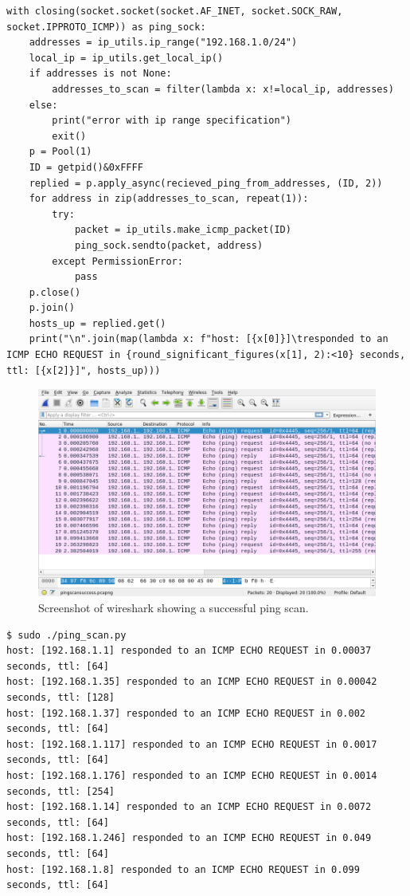 \documentclass[titlepage]{article}
\begin{document}
\begin{lstlisting}[label=pingscan,caption=An attempt at making a ping scanner.]
with closing(socket.socket(socket.AF_INET, socket.SOCK_RAW, socket.IPPROTO_ICMP)) as ping_sock:
    addresses = ip_utils.ip_range("192.168.1.0/24")
    local_ip = ip_utils.get_local_ip()
    if addresses is not None:
        addresses_to_scan = filter(lambda x: x!=local_ip, addresses)
    else:
        print("error with ip range specification")
        exit()
    p = Pool(1)
    ID = getpid()&0xFFFF
    replied = p.apply_async(recieved_ping_from_addresses, (ID, 2))
    for address in zip(addresses_to_scan, repeat(1)):
        try:
            packet = ip_utils.make_icmp_packet(ID)
            ping_sock.sendto(packet, address)
        except PermissionError:
            pass
    p.close()
    p.join()
    hosts_up = replied.get()
    print("\n".join(map(lambda x: f"host: [{x[0]}]\tresponded to an ICMP ECHO REQUEST in {round_significant_figures(x[1], 2):<10} seconds, ttl: [{x[2]}]", hosts_up)))
\end{lstlisting}

\begin{figure}[H]
  \centering
  \includegraphics[width=\textwidth]{screenshots/pingscan.png}
  \caption{%
    Screenshot of wireshark showing a successful ping scan.
  }\label{pingscansuccess}
\end{figure}

\lstset{language=C}
\begin{lstlisting}[label=pingscanout,caption=The output of from the ping scanner on the run which generated the \gls{pcap} file in figure~\ref{pingscansuccess}]
$ sudo ./ping_scan.py
host: [192.168.1.1]	responded to an ICMP ECHO REQUEST in 0.00037    seconds, ttl: [64]
host: [192.168.1.35] responded to an ICMP ECHO REQUEST in 0.00042    seconds, ttl: [128]
host: [192.168.1.37] responded to an ICMP ECHO REQUEST in 0.002      seconds, ttl: [64]
host: [192.168.1.117] responded to an ICMP ECHO REQUEST in 0.0017     seconds, ttl: [64]
host: [192.168.1.176] responded to an ICMP ECHO REQUEST in 0.0014     seconds, ttl: [254]
host: [192.168.1.14] responded to an ICMP ECHO REQUEST in 0.0072     seconds, ttl: [64]
host: [192.168.1.246] responded to an ICMP ECHO REQUEST in 0.049      seconds, ttl: [64]
host: [192.168.1.8] responded to an ICMP ECHO REQUEST in 0.099      seconds, ttl: [64]
\end{lstlisting}
\end{document}
